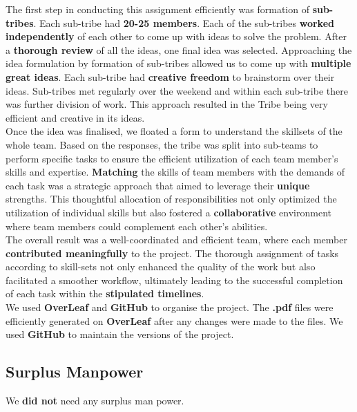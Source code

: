 The first step in conducting this assignment efficiently was formation of \textbf{sub-tribes}. Each sub-tribe had \textbf{20-25 members}. Each of the sub-tribes \textbf{worked independently} of each other to come up with ideas to solve the problem. After a \textbf{thorough review} of all the ideas, one final idea was selected. Approaching the idea formulation by formation of sub-tribes allowed us to come up with \textbf{multiple great ideas}. Each sub-tribe had \textbf{creative freedom} to brainstorm over their ideas. Sub-tribes met regularly over the weekend and within each sub-tribe there was further division of work. This approach resulted in the Tribe being very efficient and creative in its ideas.
\\

Once the idea was finalised, we floated a form to understand the skillsets of the whole team. Based on the responses, the tribe was split into sub-teams to perform specific tasks to ensure the efficient utilization of each team member's skills and expertise. \textbf{Matching} the skills of team members with the demands of each task was a strategic approach that aimed to leverage their \textbf{unique} strengths. This thoughtful allocation of responsibilities not only optimized the utilization of individual skills but also fostered a \textbf{collaborative} environment where team members could complement each other's abilities.
\\

The overall result was a well-coordinated and efficient team, where each member \textbf{contributed meaningfully} to the project. The thorough assignment of tasks according to skill-sets not only enhanced the quality of the work but also facilitated a smoother workflow, ultimately leading to the successful completion of each task within the \textbf{stipulated timelines}.
\\

We used \textbf{OverLeaf} and \textbf{GitHub} to organise the project. The \textbf{.pdf} files were efficiently generated on \textbf{OverLeaf} after any changes were made to the files. We used \textbf{GitHub} to maintain the versions of the project. 


\subsection{Surplus Manpower}
We \textbf{did not} need any surplus man power.
